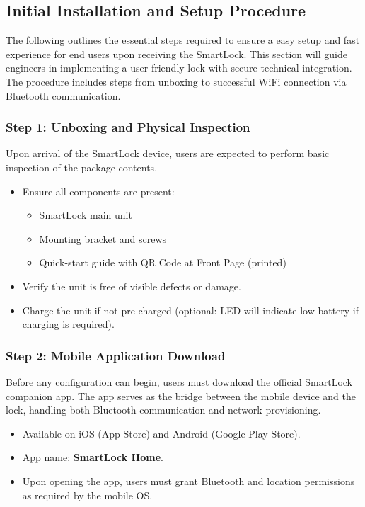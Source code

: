 \newpage
\subsection{Initial Installation and Setup Procedure}

The following outlines the essential steps required to ensure a easy setup and fast experience for end users upon receiving the SmartLock. This section will guide engineers in implementing a user-friendly lock with secure technical integration. The procedure includes steps from unboxing to successful WiFi connection via Bluetooth communication.

\subsubsection{Step 1: Unboxing and Physical Inspection}

Upon arrival of the SmartLock device, users are expected to perform basic inspection of the package contents.

\begin{itemize}
    \item Ensure all components are present:
        \begin{itemize}
            \item SmartLock main unit
            \item Mounting bracket and screws
            \item Quick-start guide with QR Code at Front Page (printed)
        \end{itemize}
    \item Verify the unit is free of visible defects or damage.
    \item Charge the unit if not pre-charged (optional: LED will indicate low battery if charging is required).
\end{itemize}

\subsubsection{Step 2: Mobile Application Download}

Before any configuration can begin, users must download the official SmartLock companion app. The app serves as the bridge between the mobile device and the lock, handling both Bluetooth communication and network provisioning.

\begin{itemize}
    \item Available on iOS (App Store) and Android (Google Play Store).
    \item App name: \textbf{SmartLock Home}.
    \item Upon opening the app, users must grant Bluetooth and location permissions as required by the mobile OS.
\end{itemize}


